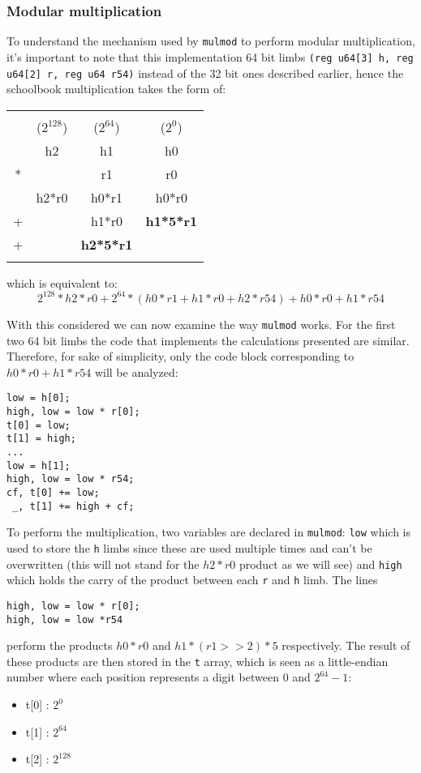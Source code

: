 \documentclass{article}
\begin{document}
\subsubsection{Modular multiplication}
To understand the mechanism used by \texttt{mulmod} to perform modular multiplication, it's important to note that this implementation 64 bit limbs 
\texttt{(reg u64[3] h, reg u64[2] r, reg u64 r54)} instead of the 32 bit ones described earlier, hence the schoolbook multiplication takes the form of:

\begin{tabular}{cccc}
    &           &                   &                   \\
    &($2^{128}$)& ($2^{64}$)        & ($2^{0}$)         \\
    & h2        & h1                & h0                \\
*   &           & r1                & r0                \\
\hline
    & h2*r0     & h0*r1             & h0*r0             \\ 
+   &           & h1*r0             & \textbf{h1*5*r1}  \\
+   &           & \textbf{h2*5*r1}  &                   \\
    &           &                   &                   \\
\end{tabular}

which is equivalent to:
$$ 2^{128}*h2*r0 + 2^{64}*(h0*r1+h1*r0+h2*r54) + h0*r0+h1*r54 $$

With this considered we can now examine the way \texttt{mulmod} works. For the first two 64 bit limbs the code that implements the calculations presented are 
similar. Therefore, for sake of simplicity, only the code block corresponding to $h0*r0+h1*r54$ will be analyzed:

\begin{Verbatim}[fontsize=\footnotesize]
low = h[0];
high, low = low * r[0];
t[0] = low;
t[1] = high;
...
low = h[1];
high, low = low * r54;
cf, t[0] += low;
 _, t[1] += high + cf;
\end{Verbatim}

To perform the multiplication, two variables are declared in \texttt{mulmod}: \texttt{low} which is used to store the \texttt{h} limbs since these are used multiple
times and can't be overwritten (this will not stand for the $h2*r0$ product as we will see) and \texttt{high} which holds the carry of the product between 
each \texttt{r} and \texttt{h} limb. The lines 
\begin{Verbatim}[fontsize=\footnotesize]
high, low = low * r[0];
high, low = low *r54
\end{Verbatim}
perform the products $h0*r0$ and $h1*(r1>>2)*5$ respectively.
The result of these products are then stored in the \texttt{t} array, which is seen as a little-endian number where each position represents a digit between $0$ 
and $2^{64}-1$: 
\begin{itemize}
    \item t[0] : $2^{0}$
    \item t[1] : $2^{64}$
    \item t[2] : $2^{128}$
\end{itemize}
\end{document}
